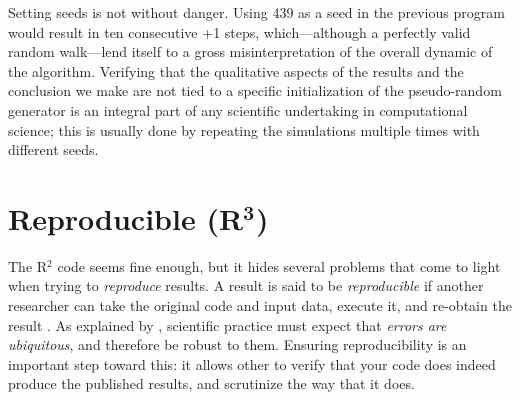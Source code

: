 \documentclass[a4paper,11pt]{article}
\begin{document}
Setting seeds is not without danger. 
Using 439 as a seed in the previous program would result in ten consecutive +1 steps, which---although a perfectly valid random walk---lend itself to a gross misinterpretation of the overall dynamic of the algorithm. 
Verifying that the qualitative aspects of the results and the conclusion we make are not tied to a specific initialization of the pseudo-random generator is an integral part of any scientific undertaking in computational science; 
this is usually done by repeating the simulations multiple times with different seeds.  




\section*{Reproducible (R$^{\mathbf 3}$)}

The R$^2$ code seems fine enough, but it hides several problems that come to light when trying to {\em reproduce} results.
A result is said to be \emph{reproducible} if another researcher can take the original code and input data, execute it, and re-obtain the result \parencite{Peng:2006}. As explained by \citeauthor{Donoho:2009} \parencite{Donoho:2009}, scientific practice must expect that {\em errors are ubiquitous}, and therefore be robust to them. Ensuring reproducibility is an important step toward this: it allows other to verify that your code does indeed produce the published results, and scrutinize the way that it does.\\
\end{document}
